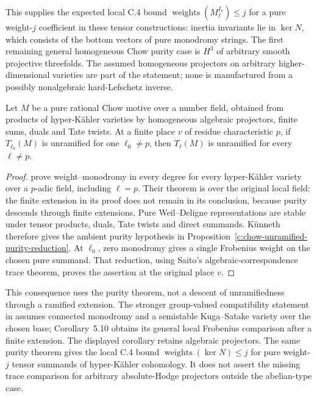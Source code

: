 This supplies the expected local C.4 bound
$\operatorname{weights}(M_\ell^{I_v})\le j$ for a pure weight-$j$
coefficient in these tensor constructions: inertia invariants lie
in $\ker N$, which consists of the bottom vectors of pure monodromy
strings.  The first remaining general homogeneous Chow purity case
is $H^3$ of arbitrary smooth projective threefolds.  The assumed
homogeneous projectors on arbitrary higher-dimensional varieties
are part of the statement; none is manufactured from a possibly
nonalgebraic hard-Lefschetz inverse.

\begin{corollary}
\label{c:hyperkahler-chow-unramified}
Let $M$ be a pure rational Chow motive over a number field, obtained
from products of hyper-K\"ahler varieties by homogeneous algebraic
projectors, finite sums, duals and Tate twists.  At a finite place
$v$ of residue characteristic $p$, if $T_{\ell_0}(M)$ is unramified
for one $\ell_0\ne p$, then $T_\ell(M)$ is unramified for every
$\ell\ne p$.
\end{corollary}

\begin{proof}
\citet[Theorem~4.4, with Lemmas~4.2--4.3]{c_itozou2026}
prove weight--monodromy in every degree for every hyper-K\"ahler
variety over a $p$-adic field, including $\ell=p$.  Their theorem
is over the original local field: the finite extension in its proof
does not remain in its conclusion, because purity descends through
finite extensions.  Pure Weil--Deligne representations are stable
under tensor products, duals, Tate twists and direct summands.
K\"unneth therefore gives the ambient purity hypothesis in Proposition~\ref{c:chow-unramified-purity-reduction}.  At $\ell_0$, zero monodromy gives
a single Frobenius weight on the chosen pure summand.  That reduction,
using Saito's algebraic-correspondence trace theorem, proves the
assertion at the original place $v$.
\end{proof}

This consequence uses the purity theorem, not a descent of
unramifiedness through a ramified extension.  The stronger
group-valued compatibility statement in
\citet[Theorem~5.8 and Remark~5.9]{c_itozou2026} assumes connected
monodromy and a semistable Kuga--Satake variety over the chosen base;
Corollary~5.10 obtains its general local Frobenius comparison after
a finite extension.  The displayed corollary retains algebraic
projectors.  The same purity theorem gives the local C.4 bound
$\operatorname{weights}(\ker N)\le j$ for pure weight-$j$
tensor summands of hyper-K\"ahler cohomology.  It does not assert the missing trace comparison for
arbitrary absolute-Hodge projectors outside the abelian-type case.

